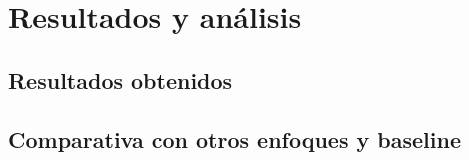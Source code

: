%
\chapter{Resultados y análisis}
\label{sec::capitulo4}

\section{Resultados obtenidos}

\section{Comparativa con otros enfoques y baseline}
